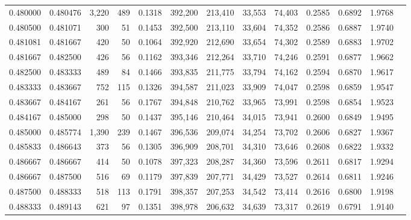 \begin{tabular}{rrrrrrrrrrrrr}
0.480000 & 0.480476 & 3,220 & 489 &                                     0.1318 & 392,200 & 213,410 &  33,553 &  74,403 & 0.2585 & 0.6892 & 1.9768 \\
0.480500 & 0.481071 &   300 &  51 &                                     0.1453 & 392,500 & 213,110 &  33,604 &  74,352 & 0.2586 & 0.6887 & 1.9740 \\
0.481081 & 0.481667 &   420 &  50 &                                     0.1064 & 392,920 & 212,690 &  33,654 &  74,302 & 0.2589 & 0.6883 & 1.9702 \\
0.481667 & 0.482500 &   426 &  56 &                                     0.1162 & 393,346 & 212,264 &  33,710 &  74,246 & 0.2591 & 0.6877 & 1.9662 \\
0.482500 & 0.483333 &   489 &  84 &                                     0.1466 & 393,835 & 211,775 &  33,794 &  74,162 & 0.2594 & 0.6870 & 1.9617 \\
0.483333 & 0.483667 &   752 & 115 &                                     0.1326 & 394,587 & 211,023 &  33,909 &  74,047 & 0.2598 & 0.6859 & 1.9547 \\
0.483667 & 0.484167 &   261 &  56 &                                     0.1767 & 394,848 & 210,762 &  33,965 &  73,991 & 0.2598 & 0.6854 & 1.9523 \\
0.484167 & 0.485000 &   298 &  50 &                                     0.1437 & 395,146 & 210,464 &  34,015 &  73,941 & 0.2600 & 0.6849 & 1.9495 \\
0.485000 & 0.485774 & 1,390 & 239 &                                     0.1467 & 396,536 & 209,074 &  34,254 &  73,702 & 0.2606 & 0.6827 & 1.9367 \\
0.485833 & 0.486643 &   373 &  56 &                                     0.1305 & 396,909 & 208,701 &  34,310 &  73,646 & 0.2608 & 0.6822 & 1.9332 \\
0.486667 & 0.486667 &   414 &  50 &                                     0.1078 & 397,323 & 208,287 &  34,360 &  73,596 & 0.2611 & 0.6817 & 1.9294 \\
0.486667 & 0.487500 &   516 &  69 &                                     0.1179 & 397,839 & 207,771 &  34,429 &  73,527 & 0.2614 & 0.6811 & 1.9246 \\
0.487500 & 0.488333 &   518 & 113 &                                     0.1791 & 398,357 & 207,253 &  34,542 &  73,414 & 0.2616 & 0.6800 & 1.9198 \\
0.488333 & 0.489143 &   621 &  97 &                                     0.1351 & 398,978 & 206,632 &  34,639 &  73,317 & 0.2619 & 0.6791 & 1.9140 \\

\end{tabular}
